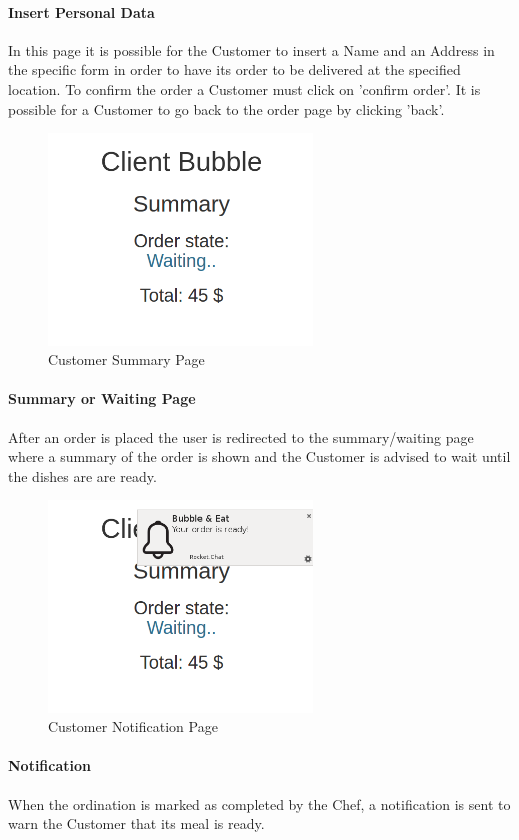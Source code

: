 \paragraph{Insert Personal Data}
In this page it is possible for the Customer to insert a Name and an Address in the specific form in order to have its order to be delivered at the specified location. To confirm the order a Customer must click on 'confirm order'. 
It is possible for a Customer to go back to the order page by clicking 'back'.

\begin{figure}[H]
	\centering
	\includegraphics[width=7cm]{../../documenti/UserManualDemo/demo_screens/client_summary.png}
	\caption{Customer Summary Page}
\end{figure}
\paragraph{Summary or Waiting Page}
After an order is placed the user is redirected to the summary/waiting page where a summary of the order is shown and the Customer is advised to wait until the dishes are are ready.

\begin{figure}[H]
	\centering
	\includegraphics[width=7cm]{../../documenti/UserManualDemo/demo_screens/client_notification.png}
	\caption{Customer Notification Page}
\end{figure}
\paragraph{Notification}
When the ordination is marked as completed by the Chef, a notification is sent to warn the Customer that its meal is ready.

